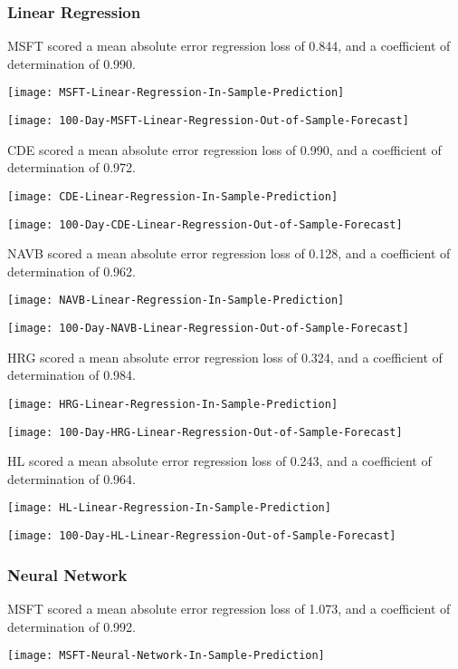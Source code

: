 \subsubsection{Linear Regression}
MSFT scored a mean absolute error regression loss of 0.844, and a coefficient of determination of 0.990.

\texttt{[image: MSFT-Linear-Regression-In-Sample-Prediction]}

\texttt{[image: 100-Day-MSFT-Linear-Regression-Out-of-Sample-Forecast]}

CDE scored a mean absolute error regression loss of 0.990, and a coefficient of determination of 0.972.

\texttt{[image: CDE-Linear-Regression-In-Sample-Prediction]}

\texttt{[image: 100-Day-CDE-Linear-Regression-Out-of-Sample-Forecast]}

NAVB scored a mean absolute error regression loss of 0.128, and a coefficient of determination of 0.962.

\texttt{[image: NAVB-Linear-Regression-In-Sample-Prediction]}

\texttt{[image: 100-Day-NAVB-Linear-Regression-Out-of-Sample-Forecast]}

HRG scored a mean absolute error regression loss of 0.324, and a coefficient of determination of 0.984.

\texttt{[image: HRG-Linear-Regression-In-Sample-Prediction]}

\texttt{[image: 100-Day-HRG-Linear-Regression-Out-of-Sample-Forecast]}

HL scored a mean absolute error regression loss of 0.243, and a coefficient of determination of 0.964.

\texttt{[image: HL-Linear-Regression-In-Sample-Prediction]}

\texttt{[image: 100-Day-HL-Linear-Regression-Out-of-Sample-Forecast]}

\subsubsection{Neural Network}
MSFT scored a mean absolute error regression loss of 1.073, and a coefficient of determination of 0.992.

\texttt{[image: MSFT-Neural-Network-In-Sample-Prediction]}

